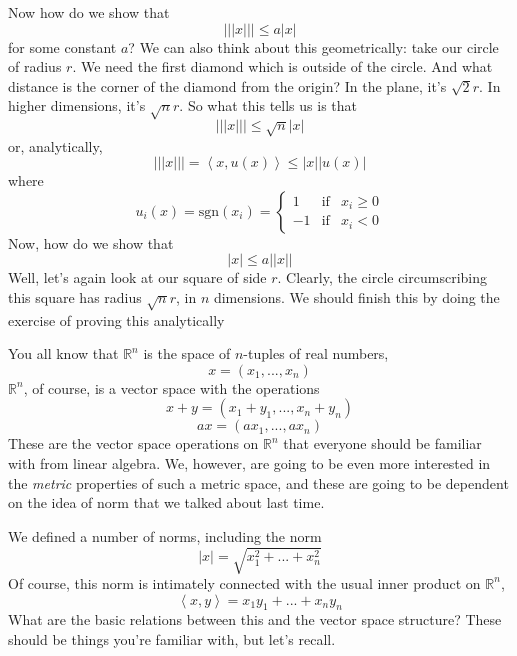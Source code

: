 \documentclass{article}
\newcommand{\reals}[0]{\mathbb{R}}
\newcommand{\ip}[2]{\left\langle#1,#2\right\rangle}
\begin{document}
Now how do we show that
\begin{equation}|||x||| \leq a|x|\end{equation}
for some constant \(a\)? We can also think about this geometrically: take our circle of radius \(r\). We need the first diamond which is outside of the circle. And what distance is the corner of the diamond from the origin? In the plane, it's \(\sqrt{2}r\). In higher dimensions, it's \(\sqrt{n}r\). So what this tells us is that
\begin{equation}|||x||| \leq \sqrt{n}|x|\end{equation}
or, analytically,
\begin{equation}|||x||| = \ip{x}{u(x)} \leq |x||u(x)|\end{equation}
where
\begin{equation}u_i(x) = \text{sgn}(x_i) = \left\{\begin{array}{ccc} 1 & \text{if} & x_i \geq 0 \\ -1 & \text{if} & x_i < 0 \end{array}\right.\end{equation}
Now, how do we show that
\begin{equation}|x| \leq a||x||\end{equation}
Well, let's again look at our square of side \(r\). Clearly, the circle circumscribing this square has radius \(\sqrt{n}r\), in \(n\) dimensions. We should finish this by doing the exercise of proving this analytically


You all know that \(\reals^n\) is the space of \(n\)-tuples of real numbers,
\begin{equation}x = (x_1,...,x_n)\end{equation}
\(\reals^n\), of course, is a vector space with the operations
\begin{equation}x + y = (x_1 + y_1,...,x_n + y_n)\end{equation}
\begin{equation}ax = (ax_1,...,ax_n)\end{equation}
These are the vector space operations on \(\reals^n\) that everyone should be familiar with from linear algebra. We, however, are going to be even more interested in the \textit{metric} properties of such a metric space, and these are going to be dependent on the idea of norm that we talked about last time.

We defined a number of norms, including the norm
\begin{equation}|x| = \sqrt{x_1^2 + ... + x_n^2}\end{equation}
Of course, this norm is intimately connected with the usual inner product on \(\reals^n\),
\begin{equation}\ip{x}{y} = x_1y_1 + ... + x_ny_n\end{equation}
What are the basic relations between this and the vector space structure? These should be things you're familiar with, but let's recall.
\end{document}
